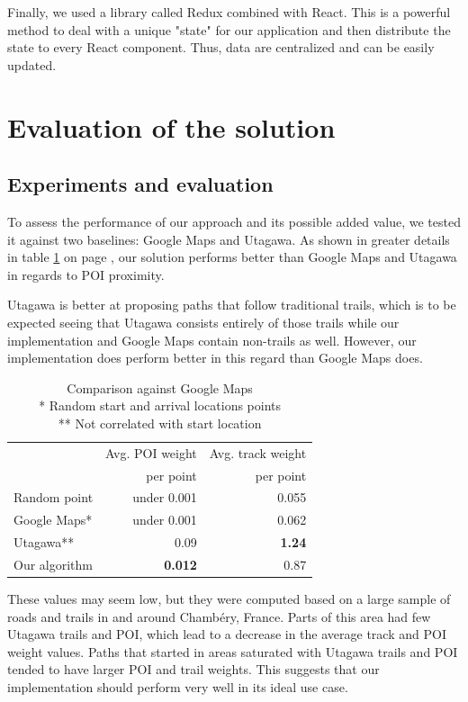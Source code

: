 \documentclass[sigconf]{acmart}
\begin{document}
Finally, we used a library called Redux combined with React. This is a powerful method to deal with a unique "state" for our application and then distribute the state to every React component. Thus, data are centralized and can be easily updated.

\section{Evaluation of the solution}

\subsection{Experiments and evaluation}

To assess the performance of our approach and its possible added value, we tested it against two baselines: Google Maps and Utagawa. As shown in greater details in table \ref{table:baselines} on page \pageref{table:baselines}, our solution performs better than Google Maps and Utagawa in regards to POI proximity.

Utagawa is better at proposing paths that follow traditional trails, which is to be expected seeing that Utagawa consists entirely of those trails while our implementation and Google Maps contain non-trails as well. However, our implementation does perform better in this regard than Google Maps does.


\begin{table}
    \begin{tabular}{|lrr|} 
        \hline
        & Avg. POI weight & Avg. track weight \\
        &  per point & per point \\ 
        \hline
        Random point & under 0.001 & 0.055 \\ 
        Google Maps* & under 0.001 & 0.062 \\
        Utagawa** & 0.09 & \textbf{1.24} \\
        Our algorithm & \textbf{0.012} & 0.87 \\
        \hline
    \end{tabular}
    \captionsetup{justification=centering}
    \caption{Comparison against Google Maps\\ 
    * Random start and arrival locations points \\
    ** Not correlated with start location}
    \label{table:baselines}
    \end{table}

These values may seem low, but they were computed based on a large sample of roads and trails in and around Chamb\'{e}ry, France. Parts of this area had few Utagawa trails and POI, which lead to a decrease in the average track and POI weight values. Paths that started in areas saturated with Utagawa trails and POI tended to have larger POI and trail weights. This suggests that our implementation should perform very well in its ideal use case. 
    
\end{document}
